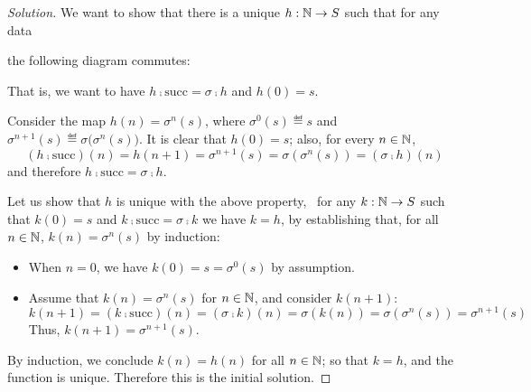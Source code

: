 \begin{proof}[Solution]
    We want to show that there is a unique $h: \mathbb{N} \to S$ such that for any
    data
    \begin{center}
    \end{center}
    the following diagram commutes:
    \begin{center}
    \end{center}
    That is, we want to have $h \comp \mathrm{succ} = \sigma \comp h$ and
    $h(0) = s$.

    Consider the map $h(n) = \sigma^n (s)$, where $\sigma^0(s)\eqdef s$ and
    $\sigma^{n+1}(s)\eqdef\sigma\big(\sigma^n(s)\big)$.  It is clear that
    $h(0) = s$; also, for every $n \in \mathbb{N}$,
    \[ (h \comp \mathrm{succ})(n) = h(n+1) = \sigma^{n+1}(s) =
    \sigma(\sigma^{n}(s)) = (\sigma \comp h)(n) \]
    and therefore $h \comp \mathrm{succ} = \sigma \comp h$.

    Let us show that $h$ is unique with the above property, \ie~for any
    $k:\mathbb{N}\to S$ such that $k(0) = s$ and $k \comp \mathrm{succ} = \sigma
    \comp k$ we have $k = h$, by establishing that, for all $n \in \mathbb{N}$,
    $k(n) = \sigma^{n} (s)$ by induction:

    \begin{itemize}

    \item When $n=0$, we have $k(0) = s = \sigma^0(s)$ by assumption.

    \item Assume that $k(n) = \sigma^n(s)$ for $n \in \mathbb{N}$, and consider
    $k(n+1)$:
    \[ k(n + 1) = (k \comp \mathrm{succ})(n) = (\sigma \comp k)(n) =
    \sigma(k(n)) = \sigma(\sigma^{n}(s)) = \sigma^{n+1}(s) \]
    Thus, $k(n + 1) = \sigma^{n + 1}(s)$.

    \end{itemize}

    By induction, we conclude $k(n) = h(n)$ for all $n\in\mathbb{N}$; so that
    $k = h$, and the function is unique.  Therefore this is the initial
    solution.
\end{proof}


